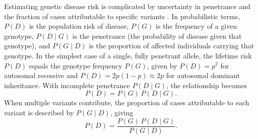 %
%
%

Estimating genetic disease risk is complicated by uncertainty in penetrance and the fraction of cases attributable to specific variants \cite{zschocke_mendelian_2023}.
In probabilistic terms, \(P(D)\) is the population risk of disease, \(P(G)\) is the frequency of a given genotype, \(P(D\mid G)\) is the penetrance (the probability of disease given that genotype), and \(P(G\mid D)\) is the proportion of affected individuals carrying that genotype.  
In the simplest case of a single, fully penetrant allele, the lifetime risk \(P(D)\) equals the genotype frequency \(P(G)\), given by \(P(D)=p^2\) for autosomal recessive and \(P(D)=2p(1-p)\approx2p\) for autosomal dominant inheritance.
With incomplete penetrance \(P(D\mid G)\), the relationship becomes
\[
P(D)=P(G)\,P(D\mid G).
\]
When multiple variants contribute, the proportion of cases attributable to each variant is described by \(P(G\mid D)\), giving  
\[
P(D)=\frac{P(G)\,P(D\mid G)}{P(G\mid D)}.
\]

